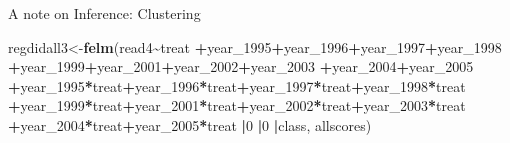 \documentclass[
  ignorenonframetext,
]{beamer}
\newenvironment{Shaded}{\begin{snugshade}}{\end{snugshade}}
\newcommand{\DecValTok}[1]{\textcolor[rgb]{0.00,0.00,0.81}{#1}}
\newcommand{\FunctionTok}[1]{\textcolor[rgb]{0.13,0.29,0.53}{\textbf{#1}}}
\newcommand{\NormalTok}[1]{#1}
\newcommand{\OtherTok}[1]{\textcolor[rgb]{0.56,0.35,0.01}{#1}}
\newcommand{\SpecialCharTok}[1]{\textcolor[rgb]{0.81,0.36,0.00}{\textbf{#1}}}
\begin{document}
\begin{frame}[fragile]{A note on Inference: Clustering}
\begin{Shaded}
\begin{Highlighting}[]
\NormalTok{regdidall3}\OtherTok{\textless{}{-}}\FunctionTok{felm}\NormalTok{(read4}\SpecialCharTok{\textasciitilde{}}\NormalTok{treat}
                 \SpecialCharTok{+}\NormalTok{year\_1995}\SpecialCharTok{+}\NormalTok{year\_1996}\SpecialCharTok{+}\NormalTok{year\_1997}\SpecialCharTok{+}\NormalTok{year\_1998}
                 \SpecialCharTok{+}\NormalTok{year\_1999}\SpecialCharTok{+}\NormalTok{year\_2001}\SpecialCharTok{+}\NormalTok{year\_2002}\SpecialCharTok{+}\NormalTok{year\_2003}
                 \SpecialCharTok{+}\NormalTok{year\_2004}\SpecialCharTok{+}\NormalTok{year\_2005}
                 \SpecialCharTok{+}\NormalTok{year\_1995}\SpecialCharTok{*}\NormalTok{treat}\SpecialCharTok{+}\NormalTok{year\_1996}\SpecialCharTok{*}\NormalTok{treat}\SpecialCharTok{+}\NormalTok{year\_1997}\SpecialCharTok{*}\NormalTok{treat}\SpecialCharTok{+}\NormalTok{year\_1998}\SpecialCharTok{*}\NormalTok{treat}
                 \SpecialCharTok{+}\NormalTok{year\_1999}\SpecialCharTok{*}\NormalTok{treat}\SpecialCharTok{+}\NormalTok{year\_2001}\SpecialCharTok{*}\NormalTok{treat}\SpecialCharTok{+}\NormalTok{year\_2002}\SpecialCharTok{*}\NormalTok{treat}\SpecialCharTok{+}\NormalTok{year\_2003}\SpecialCharTok{*}\NormalTok{treat}
                 \SpecialCharTok{+}\NormalTok{year\_2004}\SpecialCharTok{*}\NormalTok{treat}\SpecialCharTok{+}\NormalTok{year\_2005}\SpecialCharTok{*}\NormalTok{treat}
                 \SpecialCharTok{|}\DecValTok{0}
                 \SpecialCharTok{|}\DecValTok{0}
                 \SpecialCharTok{|}\NormalTok{class,}
\NormalTok{                 allscores)}
\end{Highlighting}
\end{Shaded}
\end{frame}
\end{document}

